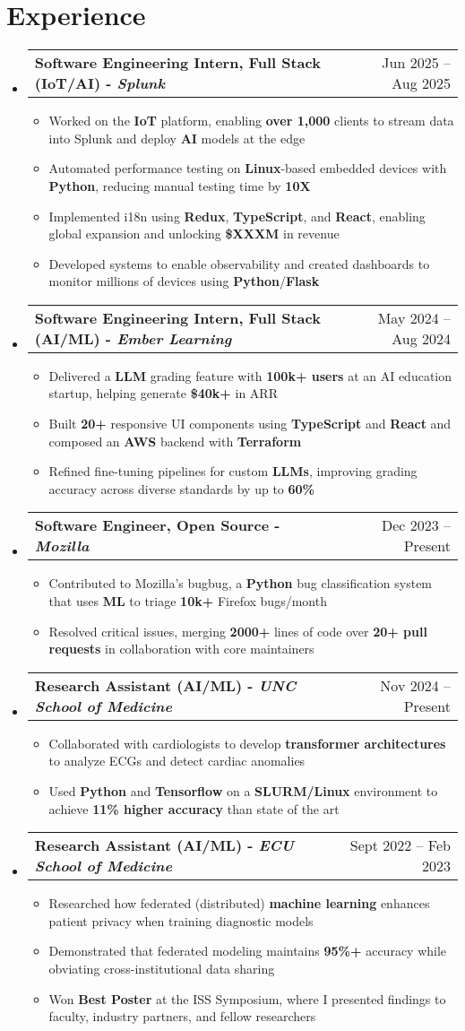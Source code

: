 \documentclass[letterpaper,11pt]{article}
\makeatletter
\newcommand{\resumeItem}[1]{
  \item\small{
    {#1 \vspace{-2pt}}}
}
\newcommand{\resumeSubheading}[2]{
  \vspace{-2pt}\item
    \begin{tabular*}{0.97\textwidth}[t]{l@{\extracolsep{\fill}}r}
      \textbf{#1} & #2 \\
    \end{tabular*}
    \vspace{-7pt}
}
\newcommand{\resumeSubHeadingListStart}{\begin{itemize}[leftmargin=0.15in, label={}]}
\newcommand{\resumeSubHeadingListEnd}{\end{itemize}}
\newcommand{\resumeItemListStart}{\begin{itemize}[leftmargin=0.15in]}
\newcommand{\resumeItemListEnd}{\end{itemize}\vspace{-5pt}}
\makeatother
\begin{document}
\section{Experience}
  \resumeSubHeadingListStart
  \resumeSubheading
  {\textbf{ Software Engineering Intern, Full Stack (IoT/AI)} - \textit{Splunk}}{Jun 2025 -- Aug 2025}
  \resumeItemListStart
    \resumeItem{Worked on the \textbf{IoT} platform, enabling \textbf{over 1,000} clients to stream data into Splunk and deploy \textbf{AI} models at the edge}
    \resumeItem{Automated performance testing on \textbf{Linux}-based embedded devices with \textbf{Python}, reducing manual testing time by \textbf{10X}}
    \resumeItem{Implemented i18n using \textbf{Redux}, \textbf{TypeScript}, and \textbf{React}, enabling global expansion and unlocking \textbf{\$XXXM} in revenue}
    \resumeItem{Developed systems to enable observability and created dashboards to monitor millions of devices using \textbf{Python}/\textbf{Flask}}
  \resumeItemListEnd
  \resumeSubheading
      {\textbf{Software Engineering Intern, Full Stack (AI/ML)} - \textit{Ember Learning}}{May 2024 -- Aug 2024}
      \resumeItemListStart
        \resumeItem{Delivered a \textbf{LLM} grading feature with \textbf{100k+ users} at an AI education startup, helping generate \textbf{\$40k+} in ARR}
        \resumeItem{Built \textbf{20+} responsive UI components using \textbf{TypeScript} and \textbf{React} and composed an \textbf{AWS} backend with \textbf{Terraform}}
        \resumeItem{Refined fine-tuning pipelines for custom \textbf{LLMs}, improving grading accuracy across diverse standards by up to \textbf{60\%}}
      \resumeItemListEnd
      \resumeSubheading
      {\textbf{Software Engineer, Open Source} - \textit{Mozilla}}{Dec 2023 -- Present}
      \resumeItemListStart
        \resumeItem{Contributed to Mozilla's bugbug, a \textbf{Python} bug classification system that uses \textbf{ML} to triage \textbf{10k+} Firefox bugs/month} 
        \resumeItem{Resolved critical issues, merging \textbf{2000+} lines of code over \textbf{20+ pull requests} in collaboration with core maintainers}
      \resumeItemListEnd
      \resumeSubheading
      {\textbf{Research Assistant (AI/ML)} - \textit{UNC School of Medicine}}{ Nov 2024 -- Present}
      \resumeItemListStart
        \resumeItem{Collaborated with cardiologists to develop \textbf{transformer architectures} to analyze ECGs and detect cardiac anomalies}
        \resumeItem{Used \textbf{Python} and \textbf{Tensorflow} on a \textbf{SLURM/Linux} environment to achieve \textbf{11\% higher accuracy} than state of the art}
      \resumeItemListEnd
      \resumeSubheading
      {\textbf{Research Assistant (AI/ML)} - \textit{ECU School of Medicine}}{Sept 2022 -- Feb 2023}
      \resumeItemListStart
        \resumeItem{Researched how federated (distributed) \textbf{machine learning} enhances patient privacy when training diagnostic models}
        \resumeItem{Demonstrated that federated modeling maintains \textbf{95\%+} accuracy while obviating cross-institutional data sharing}
        \resumeItem{Won \textbf{Best Poster} at the ISS Symposium, where I presented findings to faculty, industry partners, and fellow researchers}
      \resumeItemListEnd
  \resumeSubHeadingListEnd
\end{document}
